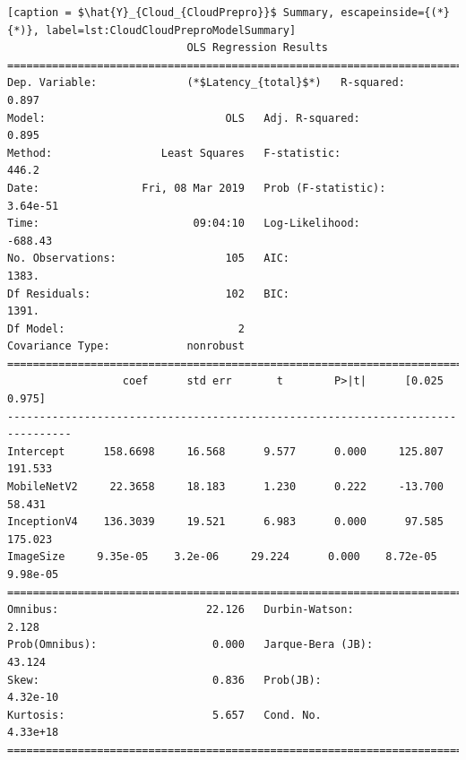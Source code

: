 \begin{minipage}{\linewidth}
\begin{lstlisting}[caption = $\hat{Y}_{Cloud_{CloudPrepro}}$ Summary, escapeinside={(*}{*)}, label=lst:CloudCloudPreproModelSummary]
                            OLS Regression Results                            
==============================================================================
Dep. Variable:              (*$Latency_{total}$*)   R-squared:                       0.897
Model:                            OLS   Adj. R-squared:                  0.895
Method:                 Least Squares   F-statistic:                     446.2
Date:                Fri, 08 Mar 2019   Prob (F-statistic):           3.64e-51
Time:                        09:04:10   Log-Likelihood:                -688.43
No. Observations:                 105   AIC:                             1383.
Df Residuals:                     102   BIC:                             1391.
Df Model:                           2                                         
Covariance Type:            nonrobust                                         
================================================================================
                  coef      std err       t        P>|t|      [0.025      0.975]
--------------------------------------------------------------------------------
Intercept      158.6698     16.568      9.577      0.000     125.807     191.533
MobileNetV2     22.3658     18.183      1.230      0.222     -13.700      58.431
InceptionV4    136.3039     19.521      6.983      0.000      97.585     175.023
ImageSize     9.35e-05    3.2e-06     29.224      0.000    8.72e-05    9.98e-05
==============================================================================
Omnibus:                       22.126   Durbin-Watson:                   2.128
Prob(Omnibus):                  0.000   Jarque-Bera (JB):               43.124
Skew:                           0.836   Prob(JB):                     4.32e-10
Kurtosis:                       5.657   Cond. No.                     4.33e+18
==============================================================================
\end{lstlisting}
\end{minipage}